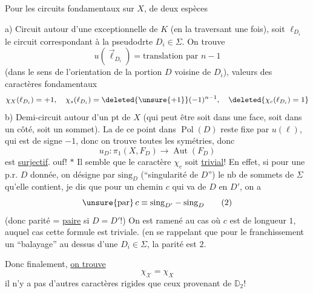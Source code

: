 Pour les circuits fondamentaux sur $X$,  de deux espèces

 a)  Circuit autour d'une   exceptionnelle de $K$ (en la traversant une fois), soit $\ell_{D_i}$ le circuit correspondant à la pseudodrte $D_i\in\Sigma$. On trouve
\[u(\vec\ell_{D_i})=\text{translation par }n-1\]
(dans le sens de l'orientation de la portion  $D$ voisine de $D_i$), valeurs des caractères fondamentaux
\[\chi_X(\ell_{D_i})=+1,\quad\chi_s(\ell_{D_i})=\deleted{\unsure{+1}}(-1)^{n-1},\quad\deleted{\chi_c(\ell_{D_i})=1}\]
b) Demi-circuit autour d'un pt de $X$ (qui peut être soit dans une face, soit dans un côté, soit  un sommet). La   de ce point dans $\operatorname{Pol}(D)$ reste fixe par $u(\ell)$, qui est de signe $-1$, donc on trouve toutes les symétries, donc
\[u_D:\pi_1(X,F_D)\longrightarrow\operatorname{Aut}(F_D)\]
est \uline{surjectif}. ouf!
$*$ Il semble que le caractère $\chi_c$ soit \uline{trivial}! En effet, si pour une p.r. $D$ donnée, on désigne par $\mathrm{sing}_D$ (``singularité de $D$'') le nb de sommets de $\Sigma$ qu'elle contient, je dis que pour un chemin $c$ qui va de $D$ en $D'$, on a
\[\unsure{\mathrm{par}}\,c\equiv\mathrm{sing}_{D'}-\mathrm{sing}_D\qquad(2)\]
(donc parité = \uline{paire} si $D=D'$!)
On est ramené au cas où $c$ est de longueur $1$, auquel cas cette formule est triviale. (en se rappelant que pour le franchissement  un ``balayage'' au dessus d'une  $D_i\in\Sigma$, la parité est $2$.

Donc finalement, \uline{on trouve}
\[\boxed{\chi_{\mathcal X}=\chi_X}\]
il n'y a pas d'autres caractères rigides que ceux provenant de $\mathbb D_2$!
